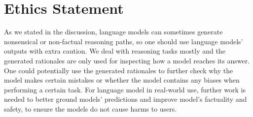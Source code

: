 \section*{Ethics Statement} As we stated in the discussion, language models can sometimes generate nonsensical or non-factual reasoning paths, so one should use language models' outputs with extra caution. We deal with reasoning tasks mostly and the generated rationales are only used for inspecting how a model reaches its answer. One could potentially use the generated rationales to further check why the model makes certain mistakes or whether the model contains any biases when performing a certain task. For language model in real-world use, further work is needed to better ground models' predictions and improve model's factuality and safety, to ensure the models do not cause harms to users.


